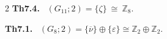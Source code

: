 \documentclass[10pt, leqno]{ltjsarticle}
\newcommand{\ov}[1]{\overline{#1}}
\newcommand{\gen}[1]{\{#1\}}       %
\newcommand{\pit}[2]{\pi_{#1}^{#2}}
\numberwithin{equation}{section}
\theoremstyle{plain}
\theoremstyle{definition}
\theoremstyle{remark}
\begin{document}
\begin{paracol}{2}
\noindent
\textbf{Th7.4.}\
\((G_{11};2)=\gen{\zeta}\ \cong\ \mathbb Z_{8}.\)

\noindent
\textbf{Th7.1.}\
\((G_{8};2)=\gen{\ov{\nu}}\oplus\gen{\varepsilon}\cong\mathbb Z_{2}\oplus\mathbb Z_{2}.\)


\end{paracol}
\end{document}
